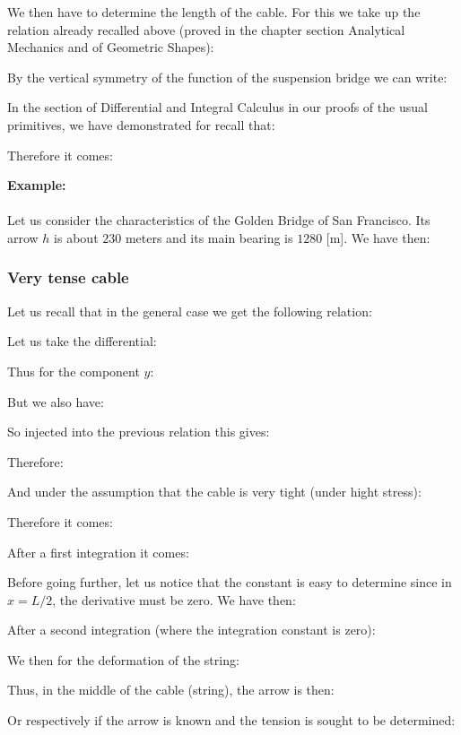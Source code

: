 	We then have to determine the length of the cable. For this we take up the relation already recalled above (proved in the chapter section Analytical Mechanics and of Geometric Shapes):
	
	By the vertical symmetry of the function of the suspension bridge we can write:
	
	In the section of Differential and Integral Calculus in our proofs of the usual primitives, we have demonstrated for recall that:
	
	Therefore it comes:
	
	\begin{tcolorbox}[colframe=black,colback=white,sharp corners]
	\textbf{{\Large {}}Example:}\\\\
	Let us consider the characteristics of the Golden Bridge of San Francisco. Its arrow $h$ is about $230$ meters and its main bearing is $1280$ [m]. We have then:
	
	\end{tcolorbox}
	
	\pagebreak
	\subsubsection{Very tense cable}
	Let us recall that in the general case we get the following relation:
	
	Let us take the differential:
	
	Thus for the component $y$:
	
	But we also have:
	
	So injected into the previous relation this gives:
	
	Therefore:
	
	And under the assumption that the cable is very tight (under hight stress):
	
	Therefore it comes:
	
	After a first integration it comes:
	
	Before going further, let us notice that the constant is easy to determine since in $x = L / 2$, the derivative must be zero. We have then:
	
	After a second integration (where the integration constant is zero):
	
	We then for the deformation of the string:
	
	Thus, in the middle of the cable (string), the arrow is then:
	
	Or respectively if the arrow is known and the tension is sought to be determined:
	

